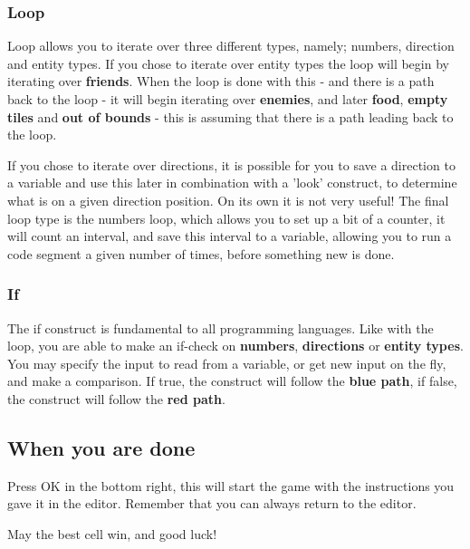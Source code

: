 \subsubsection{Loop}

Loop allows you to iterate over three different types, namely; numbers, direction and entity types. If you chose to iterate over entity types the loop will begin by iterating over \textbf{friends}. When the loop is done with this - and there is a path back to the loop - it will begin iterating over \textbf{enemies}, and later \textbf{food}, \textbf{empty tiles} and \textbf{out of bounds} - this is assuming that there is a path leading back to the loop.


If you chose to iterate over directions, it is possible for you to save a direction to a variable and use this later in combination with a 'look' construct, to determine what is on a given direction position. On its own it is not very useful! The final loop type is the numbers loop, which allows you to set up a bit of a counter, it will count an interval, and save this interval to a variable, allowing you to run a code segment a given number of times, before something new is done.

\subsubsection{If}

The if construct is fundamental to all programming languages. Like with the loop, you are able to make an if-check on \textbf{numbers}, \textbf{directions} or \textbf{entity types}. You may specify the input to read from a variable, or get new input on the fly, and make a comparison. If true, the construct will follow the \textbf{blue path}, if false, the construct will follow the \textbf{red path}.


\subsection{When you are done}

Press OK in the bottom right, this will start the game with the instructions you gave it in the editor. Remember that you can always return to the editor.


May the best cell win, and good luck!